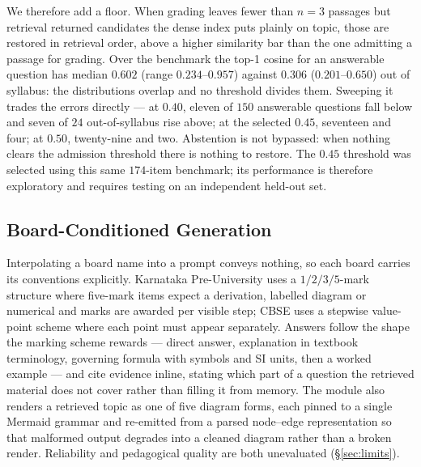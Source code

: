 \documentclass[conference]{IEEEtran}
\begin{document}
We therefore add a floor. When grading leaves fewer than $n=3$ passages but
retrieval returned candidates the dense index puts plainly on topic, those are
restored in retrieval order, above a higher similarity bar than the one
admitting a passage for grading. Over the benchmark the top-1 cosine for an
answerable question has median $0.602$ (range $0.234$--$0.957$) against $0.306$
($0.201$--$0.650$) out of syllabus: the distributions overlap and no threshold
divides them. Sweeping it trades the errors directly --- at $0.40$, eleven of
$150$ answerable questions fall below and seven of $24$ out-of-syllabus rise
above; at the selected $0.45$, seventeen and four; at $0.50$, twenty-nine and
two. Abstention is not bypassed: when nothing clears the admission threshold
there is nothing to restore. The $0.45$ threshold was selected using this same
$174$-item benchmark; its performance is therefore exploratory and requires
testing on an independent held-out set.

\subsection{Board-Conditioned Generation}
Interpolating a board name into a prompt conveys nothing, so each board carries
its conventions explicitly. Karnataka Pre-University uses a $1/2/3/5$-mark
structure where five-mark items expect a derivation, labelled diagram or
numerical and marks are awarded per visible step; CBSE uses a stepwise
value-point scheme where each point must appear separately. Answers follow the
shape the marking scheme rewards --- direct answer, explanation in textbook
terminology, governing formula with symbols and SI units, then a worked example
--- and cite evidence inline, stating which part of a question the retrieved
material does not cover rather than filling it from memory. The module also
renders a retrieved topic as one of five diagram forms, each pinned to a single
Mermaid grammar and re-emitted from a parsed node--edge representation so that
malformed output degrades into a cleaned diagram rather than a broken render.
Reliability and pedagogical quality are both unevaluated (§\ref{sec:limits}).
\end{document}
